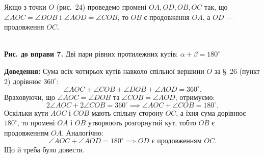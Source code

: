 \begin{problem}
Якщо з точки $O$ (рис.~24) проведемо промені $OA, OD, OB, OC$ так, що $\angle AOC = \angle DOB$ і $\angle AOD = \angle COB$, то $OB$ є продовження $OA$, а $OD$ — продовження $OC$.
\end{problem}

\begin{center}
\\[4pt]
{\small\textbf{Рис. до вправи 7.} Дві пари рівних протилежних кутів: $\alpha + \beta = 180^\circ$}
\end{center}

\textbf{Доведення:}
Сума всіх чотирьох кутів навколо спільної вершини $O$ за §~26 (пункт 2) дорівнює $360^\circ$:
\[
\angle AOC + \angle COB + \angle DOB + \angle AOD = 360^\circ.
\]
Враховуючи, що $\angle AOC = \angle DOB$ та $\angle COB = \angle AOD$, отримуємо:
\[
2 \angle AOC + 2 \angle COB = 360^\circ \implies \angle AOC + \angle COB = 180^\circ.
\]
Оскільки кути $AOC$ і $COB$ мають спільну сторону $OC$, а їхня сума дорівнює $180^\circ$, то промені $OA$ і $OB$ утворюють розгорнутий кут, тобто $OB$ є продовженням $OA$.
Аналогічно:
\[
\angle AOC + \angle AOD = 180^\circ \implies OD \text{ є продовженням } OC.
\]
Що й треба було довести.
